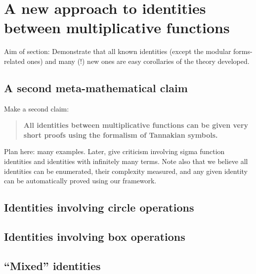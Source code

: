 \documentclass[a4paper]{article}
\theoremstyle{definition}
\theoremstyle{remark}
\begin{document}




\section{A new approach to identities between multiplicative functions}

Aim of section: Demonstrate that all known identities (except the modular forms-related ones) and many (!) new ones are easy corollaries of the theory developed. 


\subsection{A second meta-mathematical claim}

Make a second claim:
\begin{quote}
\textbf{All identities between multiplicative functions can be given very short proofs using the formalism of Tannakian symbols.}
\end{quote}

Plan here: many examples. Later, give criticism involving sigma function identities and identities with infinitely many terms. Note also that we believe all identities can be enumerated, their complexity measured, and any given identity can be automatically proved using our framework.



\subsection{Identities involving circle operations}


\subsection{Identities involving box operations}




\subsection{``Mixed'' identities}
\end{document}
